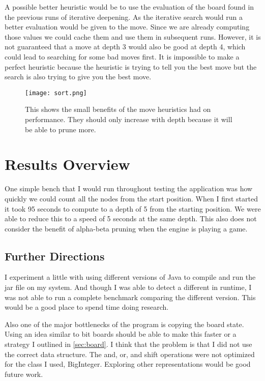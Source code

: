 \documentclass[sigconf]{acmart}
\begin{document}
A possible better heuristic would be to use the evaluation of the board found in the previous runs of iterative deepening.
As the iterative search would run a better evaluation would be given to the move.
Since we are already computing those values we could cache them and use them in subsequent runs.
However, it is not guaranteed that a move at depth 3 would also be good at depth 4, which could lead to searching for some bad moves first.
It is impossible to make a perfect heuristic because the heuristic is trying to tell you the best move but the search is also trying to give you the best move.

 \begin{figure}[H]
     \centering
     \texttt{[image: sort.png]}
     \caption{This shows the small benefits of the move heuristics had on performance. They should only increase with depth because it will be able to prune more.}
     \label{fig:enter-label}
 \end{figure}
\section{Results Overview}
One simple bench that I would run throughout testing the application was how quickly we could count all the nodes from the start position.
When I first started it took 95 seconds to compute to a depth of 5 from the starting position.
We were able to reduce this to a speed of 5 seconds at the same depth.
This also does not consider the benefit of alpha-beta pruning when the engine is playing a game.

\subsection{Further Directions}
I experiment a little with using different versions of Java to compile and run the jar file on my system.
And though I was able to detect a different in runtime, I was not able to run a complete benchmark comparing the different version.
This would be a good place to spend time doing research.

Also one of the major bottlenecks of the program is copying the board state.
Using an idea similar to bit boards should be able to make this faster or a strategy I outlined in \ref{sec:board}.
I think that the problem is that I did not use the correct data structure.
The and, or, and shift operations were not optimized for the class I used, BigInteger.
Exploring other representations would be good future work.
\end{document}
